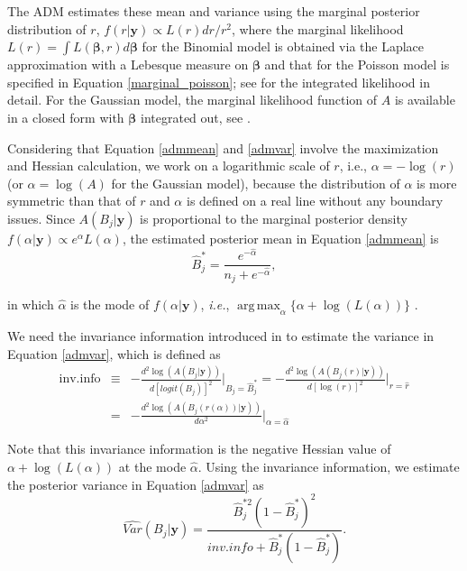 \documentclass[article]{jss}
\DeclareMathOperator*{\argmax}{arg\,max}
\begin{document}
The ADM estimates these mean and variance using the marginal posterior distribution of $r$, $f(r\vert\boldsymbol{y})\propto L(r)dr/r^2$, where the marginal likelihood $L(r)=\int L(\boldsymbol{\beta}, r)d\boldsymbol{\beta}$ for the Binomial model is obtained via the Laplace approximation with a Lebesque measure on $\boldsymbol{\beta}$ and that for the Poisson model is specified in Equation \ref{marginal_poisson}; see \cite{berger1999integrated} for the integrated likelihood in detail. For the Gaussian model, the marginal likelihood function of $A$ is available in a closed form with $\boldsymbol{\beta}$ integrated out, see  \cite{tang2011}. 

Considering that Equation \ref{admmean} and  \ref{admvar} involve the maximization and Hessian calculation, we work on a logarithmic scale of $r$, i.e., $\alpha=-\log(r)$ (or $\alpha=\log(A)$ for the Gaussian model), because the distribution of $\alpha$ is more symmetric than that of $r$ and $\alpha$ is defined on a real line without any boundary issues. Since $A(B_j\vert\boldsymbol{y})$ is proportional to the marginal posterior density $f(\alpha\vert\boldsymbol{y})\propto e^\alpha L(\alpha)$, the estimated posterior mean in Equation \ref{admmean} is 
\begin{equation}\label{meaninvariance}
\hat{B}^\ast_j=\frac{e^{-\hat{\alpha}}}{n_j+e^{-\hat{\alpha}}},
\end{equation}


in which $\hat{\alpha}$ is the mode of $f(\alpha\vert\boldsymbol{y})$, \emph{i.e.}, $\argmax_{\alpha}\{\alpha+\log(L(\alpha))\}$ .

We need the invariance information introduced in \cite{tang2011} to estimate the variance in Equation \ref{admvar}, which is defined as 
\begin{eqnarray}
\textrm{inv.info} &\equiv& -\frac{d^2 \log(A(B_j\vert \boldsymbol{y}))}{d[logit(B_j)]^2}\bigg\vert_{B_j=\hat{B}^\ast_j}=-\frac{d^2 \log(A(B_j(r)\vert \boldsymbol{y}))}{d[\log(r)]^2}\bigg\vert_{r=\hat{r}}\label{invariance}\\
&=& -\frac{d^2 \log(A(B_j(r(\alpha))\vert \boldsymbol{y}))}{d\alpha^2}\bigg\vert_{\alpha=\hat{\alpha}}\nonumber
\end{eqnarray}

Note that this invariance information is  the negative Hessian value of $\alpha+\log(L(\alpha))$ at the mode $\hat{\alpha}$. Using the invariance information, we  estimate the posterior variance in Equation \ref{admvar} as
\begin{equation}\label{varianceinvariance}
\widehat{Var}(B_j\vert\boldsymbol{y})=\frac{\hat{B}^{\ast2}_j(1-\hat{B}^\ast_j)^2}{inv.info +\hat{B}^\ast_j(1-\hat{B}^\ast_j)}.
\end{equation}
\end{document}
